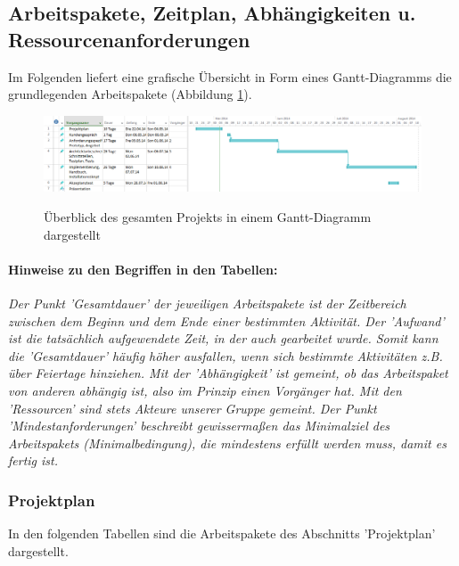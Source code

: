 \documentclass[fontsize=12pt,paper=a4,twoside]{scrartcl}
\begin{document}
\subsection{Arbeitspakete, Zeitplan, Abhängigkeiten u. Ressourcenanforderungen}\label{aps}

Im Folgenden liefert eine grafische Übersicht in Form eines Gantt-Diagramms die grundlegenden Arbeitspakete (Abbildung \ref{Gantt-Ueberblick}).\\

\begin{figure}[!h]
\caption{Überblick des gesamten Projekts in einem Gantt-Diagramm dargestellt}
\includegraphics[angle = 90, scale=0.4]{gantt_ueberblick.jpg}
\label{Gantt-Ueberblick}
\end{figure}

\newpage

\paragraph{Hinweise zu den Begriffen in den Tabellen:} \textit{Der Punkt 'Gesamtdauer' der jeweiligen Arbeitspakete ist der Zeitbereich zwischen dem Beginn und dem Ende einer bestimmten Aktivität. Der 'Aufwand' ist die tatsächlich aufgewendete Zeit, in der auch gearbeitet wurde. Somit kann die 'Gesamtdauer' häufig höher ausfallen, wenn sich bestimmte Aktivitäten z.B. über Feiertage hinziehen. Mit der 'Abhängigkeit' ist gemeint, ob das Arbeitspaket von anderen abhängig ist, also im Prinzip einen Vorgänger hat. Mit den 'Ressourcen' sind stets Akteure unserer Gruppe gemeint. Der Punkt 'Mindestanforderungen' beschreibt gewissermaßen das Minimalziel des Arbeitspakets (Minimalbedingung), die mindestens erfüllt werden muss, damit es fertig ist.}\\

\subsubsection{Projektplan}\label{aps}

In den folgenden Tabellen sind die Arbeitspakete des Abschnitts 'Projektplan' dargestellt. \\
\end{document}
